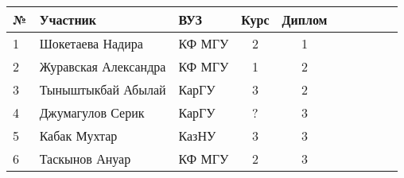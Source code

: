 \begin{center}
\begin{tabular}{|l|l|l|c|c|c|c|c|c|c|}
\hline
№ & Участник & ВУЗ & Курс & Диплом \\
\hline
1 & Шокетаева Надира & КФ МГУ & 2 & 1  \\
\hline
2 & Журавская Александра &  КФ МГУ & 1 & 2  \\
\hline
3 & Тыныштыкбай Абылай & КарГУ & 3 & 2  \\
\hline
4 & Джумагулов Серик & КарГУ & ? & 3  \\
\hline
5 & Кабак Мухтар & КазНУ & 3 & 3  \\
\hline
6 & Таскынов Ануар & КФ МГУ & 2 & 3  \\
\hline
\end{tabular}
\end{center}

